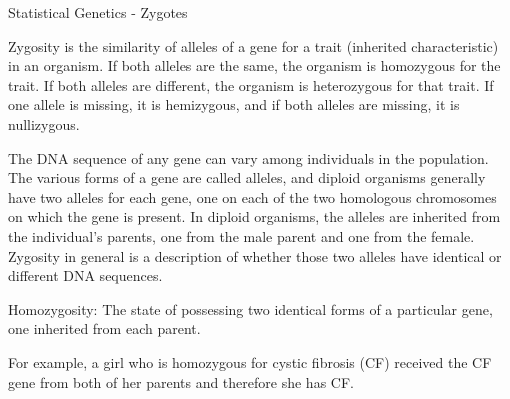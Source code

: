 Statistical Genetics - Zygotes
 
 
Zygosity is the similarity of alleles of a gene for a trait (inherited characteristic) in an organism. If both alleles are the same, the organism is homozygous for the trait. If both alleles are different, the organism is heterozygous for that trait. If one allele is missing, it is hemizygous, and if both alleles are missing, it is nullizygous.
 
The DNA sequence of any gene can vary among individuals in the population. The various forms of a gene are called alleles, and diploid organisms generally have two alleles for each gene, one on each of the two homologous chromosomes on which the gene is present. In diploid organisms, the alleles are inherited from the individual's parents, one from the male parent and one from the female. Zygosity in general is a description of whether those two alleles have identical or different DNA sequences.
 
Homozygosity: The state of possessing two identical forms of a particular gene, one inherited from each parent.
 
For example, a girl who is homozygous for cystic fibrosis (CF) received the CF gene from both of her parents and therefore she has CF.


